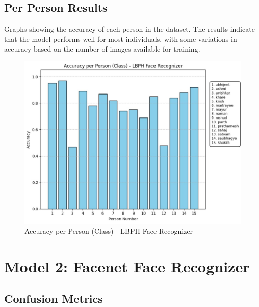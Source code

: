 \documentclass[openany]{report}
\begin{document}
\subsection{Per Person Results}
Graphs showing the accuracy of each person in the dataset. The results indicate that the model performs well for most individuals, with some variations in accuracy based on the number of images available for training.
\begin{figure}[H]
    \centering
    \includegraphics[width=.95\textwidth]{../imgs/accuracy per person.jpg}
    \caption{Accuracy per Person (Class) - LBPH Face Recognizer}
\end{figure}

\section{Model 2: Facenet Face Recognizer}
\subsection{Confusion Metrics}
\end{document}
